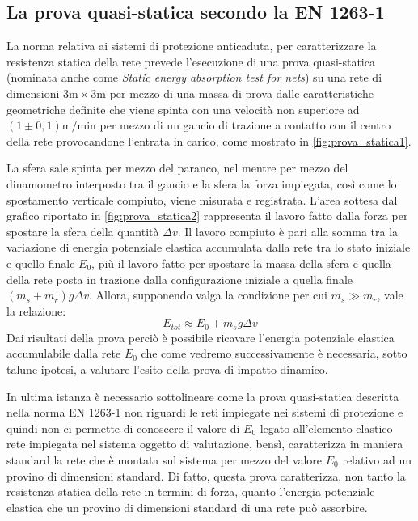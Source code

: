 \subsection{La prova quasi-statica secondo la EN 1263-1}
La norma relativa ai sistemi di protezione anticaduta, per caratterizzare la resistenza statica della rete prevede l'esecuzione di una prova quasi-statica (nominata anche come \textit{Static energy absorption test for nets}) su una rete di dimensioni $3\text{m} \times 3\text{m}$  per mezzo di una massa di prova dalle caratteristiche geometriche definite che viene spinta con una velocità non superiore ad $(1 \pm 0,1) \text{m/min}$ per mezzo di un gancio di trazione a contatto con il centro della rete provocandone l'entrata in carico, come mostrato in \cref{fig:prova_statica1}.

La sfera sale spinta per mezzo del paranco, nel mentre per mezzo del dinamometro interposto tra il gancio e la sfera la forza impiegata, così come lo spostamento verticale compiuto, viene misurata e registrata. L'area sottesa dal grafico riportato in \cref{fig:prova_statica2} rappresenta il lavoro fatto dalla forza per spostare la sfera della quantità $\Delta v$. Il lavoro compiuto è pari alla somma tra la variazione di energia potenziale elastica accumulata dalla rete tra lo stato iniziale e quello finale $E_0$, più il lavoro fatto per spostare la massa della sfera e quella della rete posta in trazione dalla configurazione iniziale a quella finale $(m_s+m_r)g \Delta v$. Allora, supponendo valga la condizione per cui $m_s \gg m_r$, vale la relazione: 
\begin{equation}
  E_{tot} \approx E_0 + m_s g \Delta v 
  \label{eq:lavoro_norma}
\end{equation}
Dai risultati della prova perciò è possibile ricavare l'energia potenziale elastica accumulabile dalla rete $E_0$ che come vedremo successivamente è necessaria, sotto talune ipotesi, a valutare l'esito della prova di impatto dinamico.

In ultima istanza è necessario sottolineare come la prova quasi-statica descritta nella norma EN 1263-1 \cite{EN1263-1} non riguardi le reti impiegate nei sistemi di protezione e quindi non ci permette di conoscere il valore di $E_0$ legato all'elemento elastico rete impiegata nel sistema oggetto di valutazione, bensì, caratterizza in maniera standard la rete che è montata sul sistema per mezzo del valore $E_0$ relativo ad un provino di dimensioni standard. Di fatto, questa prova caratterizza, non tanto la resistenza statica della rete in termini di forza, quanto l'energia potenziale elastica che un provino di dimensioni standard di una rete può assorbire.


